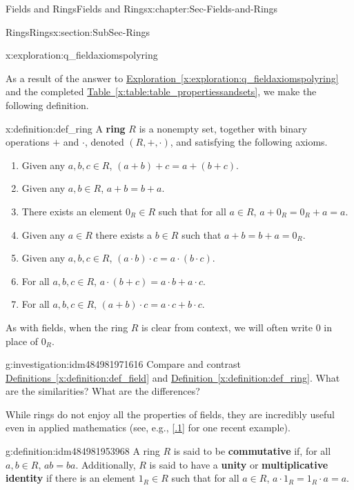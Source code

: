 \documentclass[oneside,10pt,]{book}
\newcommand{\xreffont}{\relax}
\newcommand{\terminology}[1]{\textbf{#1}}
\numberwithin{equation}{section}
\begin{document}
\begin{chapterptx}{Fields and Rings}{}{Fields and Rings}{}{}{x:chapter:Sec-Fields-and-Rings}
\begin{sectionptx}{Rings}{}{Rings}{}{}{x:section:SubSec-Rings}
\begin{exploration}{}{x:exploration:q_fieldaxiomspolyring}
\end{exploration}
As a result of the answer to \hyperref[x:exploration:q_fieldaxiomspolyring]{Exploration~{\xreffont\ref{x:exploration:q_fieldaxiomspolyring}}} and the completed \hyperref[x:table:table_propertiessandsets]{Table~{\xreffont\ref{x:table:table_propertiessandsets}}}, we make the following definition.%
\begin{definition}{}{x:definition:def_ring}%
%
A \terminology{ring} \(R\) is a nonempty set, together with binary operations \(+\) and \(\cdot\), denoted \((R,+,\cdot)\), and satisfying the following axioms.%
\begin{enumerate}
\item{}Given any \(a,b,c\in R\), \((a+b)+c = a+(b+c)\).%
\item{}Given any \(a,b\in R\), \(a+b= b+a\).%
\item{}There exists an element \(0_R\in R\) such that for all \(a\in R\), \(a+0_R = 0_R + a = a\).%
\item{}Given any \(a\in R\) there exists a \(b\in R\) such that \(a+b = b + a =0_R\).%
\item{}Given any \(a,b,c\in R\), \((a\cdot b)\cdot c = a\cdot (b\cdot c)\).%
\item{}For all \(a,b,c\in R\), \(a\cdot (b+c) = a\cdot b + a\cdot c\).%
\item{}For all \(a,b,c\in R\), \((a+b)\cdot c = a\cdot c + b\cdot c\).%
\end{enumerate}
As with fields, when the ring \(R\) is clear from context, we will often write \(0\) in place of \(0_R\).%
\end{definition}
\begin{investigation}{}{g:investigation:idm484981971616}%
Compare and contrast \hyperref[x:definition:def_field]{Definitions~{\xreffont\ref{x:definition:def_field}}} and \hyperref[x:definition:def_ring]{Definition~{\xreffont\ref{x:definition:def_ring}}}. What are the similarities? What are the differences?%
\end{investigation}
While rings do not enjoy all the properties of fields, they are incredibly useful even in applied mathematics (see, e.g., \hyperlink{x:biblio:Curto2013}{[{\xreffont 2.2.1}]} for one recent example).%
\begin{definition}{}{g:definition:idm484981953968}%
%
%
%
A ring \(R\) is said to be \terminology{commutative} if, for all \(a,b\in R\), \(ab = ba\). Additionally, \(R\) is said to have a \terminology{unity} or \terminology{multiplicative identity} if there is an element \(1_R\in R\) such that for all \(a\in R\), \(a \cdot 1_R = 1_R \cdot a= a\).%

\end{definition}
\end{sectionptx}
\end{chapterptx}
\end{document}
